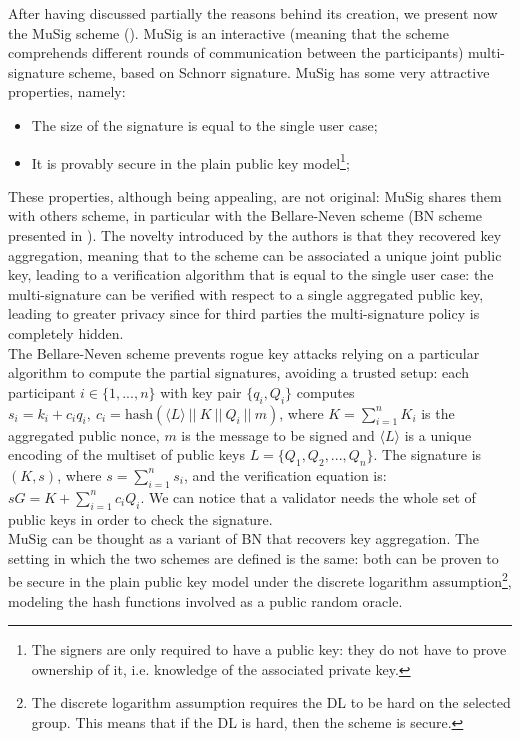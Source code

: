 \bigskip
\noindent
After having discussed partially the reasons behind its creation, we present now the MuSig scheme (\cite{RefWork:11}). MuSig is an interactive (meaning that the scheme comprehends different rounds of communication between the participants) multi-signature scheme, based on Schnorr signature. MuSig has some very attractive properties, namely:
\begin{itemize}
	\item The size of the signature is equal to the single user case;
	\item It is provably secure in the plain public key model\footnote{The signers are only required to have a public key: they do not have to prove ownership of it, i.e. knowledge of the associated private key.};
\end{itemize}
These properties, although being appealing, are not original: MuSig shares them with others scheme, in particular with the Bellare-Neven scheme (BN scheme presented in \cite{RefWork:10}). The novelty introduced by the authors is that they recovered key aggregation, meaning that to the scheme can be associated a unique joint public key, leading to a verification algorithm that is equal to the single user case: the multi-signature can be verified with respect to a single aggregated public key, leading to greater privacy since for third parties the multi-signature policy is completely hidden.
\\
The Bellare-Neven scheme prevents rogue key attacks relying on a particular algorithm to compute the partial signatures, avoiding a trusted setup: each participant $i \in \{1, ..., n\}$ with key pair $\{q_i, Q_i\}$ computes $s_i = k_i + c_iq_i, \ c_i = \text{hash}(\langle L \rangle\ || \ K \ || \ Q_i \ || \ m)$, where $K = \sum_{i = 1}^{n}K_i$ is the aggregated public nonce, $m$ is the message to be signed and $\langle L \rangle$ is a unique encoding of the multiset of public keys $L = \{Q_1, Q_2, ..., Q_n\}$. The signature is $(K, s)$, where $s = \sum_{i = 1}^{n}s_i$, and the verification equation is: $sG = K + \sum_{i = 1}^{n}c_iQ_i$. We can notice that a validator needs the whole set of public keys in order to check the signature. 
\\
MuSig can be thought as a variant of BN that recovers key aggregation. The setting in which the two schemes are defined is the same: both can be proven to be secure in the plain public key model under the discrete logarithm assumption\footnote{The discrete logarithm assumption requires the DL to be hard on the selected group. This means that if the DL is hard, then the scheme is secure.}, modeling the hash functions involved as a public random oracle.
